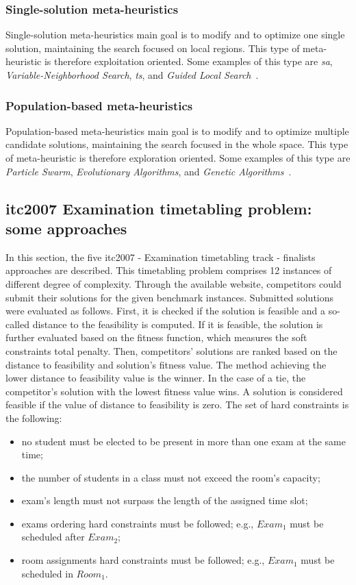 \subsubsection{Single-solution meta-heuristics}
Single-solution meta-heuristics main goal is to modify and to optimize one single solution, maintaining the search focused on local regions. This type of meta-heuristic is therefore exploitation oriented. Some examples of this type are \textit{\gls{sa}}, \textit{Variable-Neighborhood Search}, \textit{\gls{ts}}, and \textit{Guided Local Search}~\cite{Talbi2009}. 

\subsubsection{Population-based meta-heuristics}
Population-based meta-heuristics main goal is to modify and to optimize multiple candidate solutions, maintaining the search focused in the whole space. This type of meta-heuristic is therefore exploration oriented. Some examples of this type are \textit{Particle Swarm}, \textit{Evolutionary Algorithms}, and \textit{Genetic Algorithms}~\cite{Talbi2009}.

\subsection{\gls{itc2007} Examination timetabling problem: some approaches}
\label{subsection:ApprITC2007}

In this section, the five \gls{itc2007} - Examination timetabling track - finalists approaches are described. This timetabling problem comprises 12 instances of different degree of complexity. Through the available website, competitors could submit their solutions for the given benchmark instances. Submitted solutions were evaluated as follows. First, it is checked if the solution is feasible and a so-called distance to the feasibility is computed. If it is feasible, the solution is further evaluated based on the fitness function, which measures the soft constraints total penalty. Then, competitors' solutions are ranked based on the distance to feasibility and solution's fitness value. The method achieving the lower distance to feasibility value is the winner. In the case of a tie, the competitor's solution with the lowest fitness value wins. A solution is considered feasible if the value of distance to feasibility is zero. The set of hard constraints is the following:
\begin{itemize}
	\item no student must be elected to be present in more than one exam at the same time;
	\item the number of students in a class must not exceed the room's capacity;
	\item exam's length must not surpass the length of the assigned time slot;
	\item exams ordering hard constraints must be followed; e.g., $Exam_1$ must be scheduled after $Exam_2$;
	\item room assignments hard constraints must be followed; e.g., 	$Exam_1$ must be scheduled in $Room_1$.
\end{itemize}

